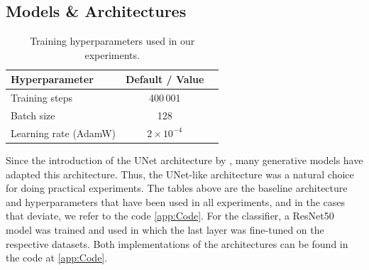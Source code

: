 \subsection{Models \& Architectures}
\label{subsec:Models}

\begin{table}[h]
  \centering
  \caption{Architectural configurations of the UNet-based models.}
  \label{tab:models}
\end{table}

\begin{table}[H]
  \centering
  \caption{Training hyperparameters used in our experiments.}
  \label{tab:hyperparams}
  \begin{tabular}{lcc}
    \toprule
    \textbf{Hyperparameter}   & \textbf{Default / Value} \\
    \midrule
    Training steps           & 400\,001 \\
    Batch size               & 128 \\
    Learning rate (AdamW)    & $2\times10^{-4}$ \\
    \bottomrule
  \end{tabular}
\end{table}

Since the introduction of the UNet architecture by \cite{ronneberger2015}, many generative models have adapted this architecture. Thus, the UNet-like architecture was a natural choice for doing practical experiments. The tables above are the baseline architecture and hyperparameters that have been used in all experiments, and in the cases that deviate, we refer to the code \ref{app:Code}. For the classifier, a ResNet50 model \cite{resnet50} was trained and used in which the last layer was fine-tuned on the respective datasets. Both implementations of the architectures can be found in the code at \ref{app:Code}.